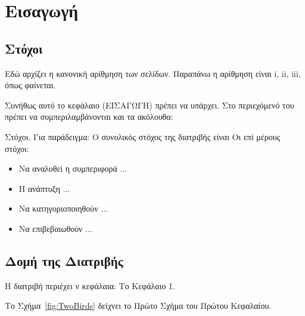 \chapter{Εισαγωγή}
\minitoc


\section{Στόχοι}\label{sec:11}
Εδώ αρχίζει η κανονική αρίθμηση των σελίδων. Παραπάνω η αρίθμηση
είναι i, ii, iii, όπως φαίνεται.

Συνήθως αυτό το κεφάλαιο (ΕΙΣΑΓΩΓΗ) πρέπει να υπάρχει. Στο
περιεχόμενό του πρέπει να συμπεριλαμβάνονται και τα ακόλουθα:

\y Στόχοι. Για παράδειγμα: Ο συνολικός στόχος της διατριβής είναι
Οι επί μέρους στόχοι:
\begin{itemize}
\item Να αναλυθεί η συμπεριφορά ...
\item Η ανάπτυξη  ...
\item Να κατηγοριοποιηθούν  ...
\item Να επιβεβαιωθούν  ...
\end{itemize}




\section{Δομή της Διατριβής}\label{sec:12}
Η διατριβή περιέχει ν κεφάλαια: Το Κεφάλαιο 1.


\newpage
Το Σχήμα~\ref{fig:TwoBirds} δείχνει το Πρώτο Σχήμα του Πρώτου Κεφαλαίου.

